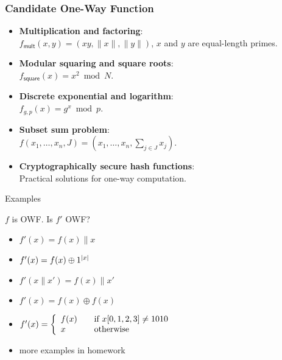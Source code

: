 \begin{comment}
\item $\mathsf{Gen}(1^n)$ obtains $I$, $\mathsf{Samp}(I)$ obtains a random $x \gets \mathcal{D}_I$. $y := f_I(x)$.
\item $\mathcal{A}$ is given $I$ and $y$ as input, and outputs $x'$.
\item $\mathsf{Invert}_{\mathcal{A},\Pi}(n) = 1$ if $f_I(x')=y$, and 0 otherwise.
\end{enumerate}
\begin{definition}
a function/permutation family $\Pi$ is \textbf{one-way} if $\forall$ \textsc{ppt} $\mathcal{A}$, $\exists\; \mathsf{negl}$ such that
\[ \Pr[\mathsf{Invert}_{\mathcal{A},\Pi}(n)=1] \le \mathsf{negl}(n). \] 
\end{definition}
\end{frame}
\end{comment}
\begin{frame}\frametitle{Candidate One-Way Function}
\begin{itemize}
\item \textbf{Multiplication and factoring}:\\
$f_{\mathsf{mult}}(x,y)=(xy,\|x\|,\|y\|)$, $x$ and $y$ are equal-length primes.
\item \textbf{Modular squaring and square roots}:\\
$f_{\mathsf{square}}(x)=x^2\bmod N$.
\item \textbf{Discrete exponential and logarithm}:\\
$f_{g,p}(x)=g^x\bmod p$.
\item \textbf{Subset sum problem}:\\
$f(x_1,\dotsc,x_n,J)=(x_1,\dotsc,x_n,\sum_{j \in J} x_j)$.
\item \textbf{Cryptographically secure hash functions}:\\
Practical solutions for one-way computation.
\end{itemize}
\end{frame}
\begin{frame}{Examples}
\begin{exampleblock}{$f$ is OWF. Is $f'$ OWF?}
\begin{itemize}
\item $f'(x) = f(x)\| x$
\item $f'(x) = f(x)\oplus 1^{\lvert x\rvert}$
\item $f'(x\|x') = f(x)\|x'$
\item $f'(x) = f(x) \oplus f(x)$
\item $ f'(x) = \left\{ 
  \begin{array}{l l}
    f(x) & \quad \text{if $x[0,1,2,3] \neq 1010$}\\
    x & \quad \text{otherwise}\\
  \end{array} \right. $
\item more examples in homework
\end{itemize}
\end{exampleblock}
\end{frame}
